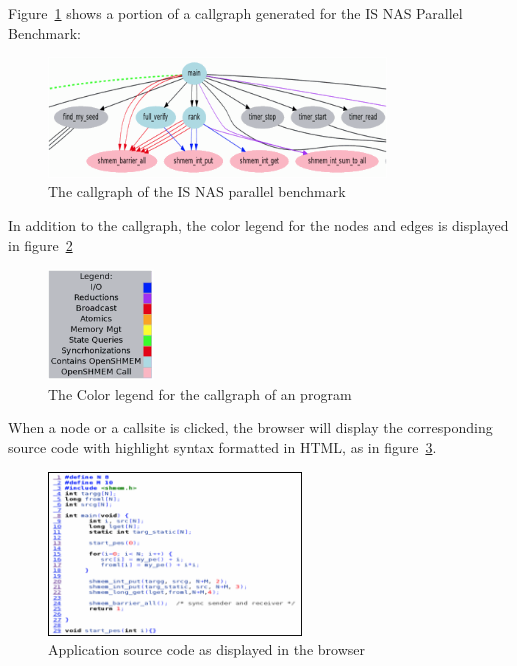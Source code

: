 \vspace{0.1in}

Figure~\ref{fig:is-callgraph} shows a portion of a callgraph generated
for the IS NAS Parallel Benchmark:

\begin{figure}[!h]
  \begin{center}
    \includegraphics[width=0.8\textwidth]{./image004}
    \caption{The \openshmem callgraph of the IS NAS parallel benchmark}
    \label{fig:is-callgraph}
  \end{center}
\end{figure}

In addition to the callgraph, the color legend for the nodes and edges
is displayed in figure~\ref{fig:colors}

\vspace{0.1in}

\begin{figure}[!h]
  \begin{center}
    \includegraphics[width=0.25\textwidth]{./image006}
    \caption{The Color legend for the callgraph of an \openshmem program}
    \label{fig:colors}
  \end{center}
\end{figure}

When a node or a callsite is clicked, the browser will display the
corresponding source code with highlight syntax formatted in HTML, as
in figure~\ref{fig:app-source}.

\vspace{0.1in}

\begin{figure}[!h]
  \begin{center}
    \includegraphics[width=0.6\textwidth]{./image008}
    \caption{Application source code as displayed in the browser}
    \label{fig:app-source}
  \end{center}
\end{figure}


